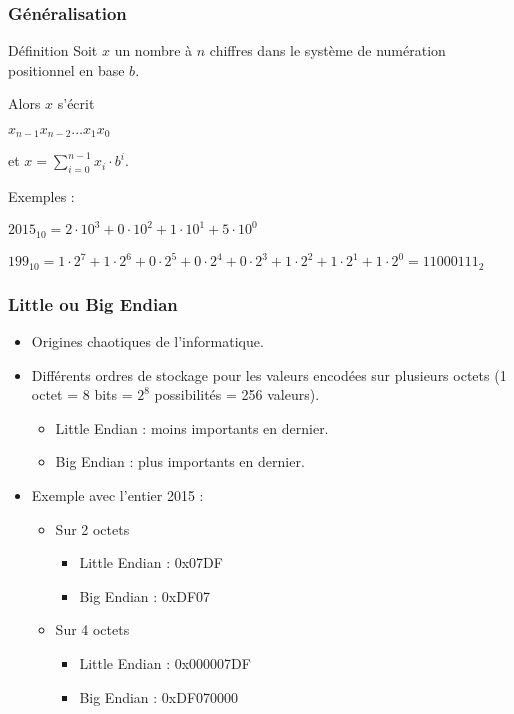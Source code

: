 	\frame
	{
		\frametitle{G\'en\'eralisation}
		\begin{block}{D\'efinition}
			Soit $x$ un nombre \`a $n$ chiffres dans le syst\`eme de num\'eration positionnel en base $b$.
			
			Alors $x$ s'\'ecrit
			
			$x_{n-1}x_{n-2}\ldots x_1x_0$
			
			et $x=\sum\limits_{i = 0}^{n-1}x_i\cdot b^i$.
		\end{block}
		
		Exemples :
		\begin{description}
			\item<2-> $2015_{10} = 2\cdot10^3 + 0\cdot10^2 + 1\cdot10^1+5\cdot10^0$
			\item<3-> $199_{10} = 1\cdot2^7 + 1\cdot2^6 + 0\cdot2^5+0\cdot2^4 + 0\cdot2^3 + 1\cdot2^2 + 1\cdot2^1+1\cdot2^0 = 11000111_2$
		\end{description}
	}

\frame
{
	\frametitle{Little ou Big Endian}
	\begin{itemize}
		\item<2-> Origines chaotiques de l'informatique.
		\item<3-> Diff\'erents ordres de stockage pour les valeurs encod\'ees sur plusieurs octets (1 octet = 8 bits = $2^8$ possibilit\'es = 256 valeurs).
		\begin{itemize}
			\item<4-> Little Endian : moins importants en dernier.
			\item<5-> Big Endian : plus importants en dernier.
		\end{itemize}
		\item<6-> Exemple avec l'entier 2015 :
		\begin{itemize}
			\item<7-> Sur 2 octets
			\begin{itemize}
				\item<8-> Little Endian : 0x07DF
				\item<9-> Big Endian : 0xDF07
			\end{itemize}
			\item<10-> Sur 4 octets
			\begin{itemize}
				\item<11-> Little Endian : 0x000007DF
				\item<12-> Big Endian : 0xDF070000
			\end{itemize}
		\end{itemize}
	\end{itemize}
}

